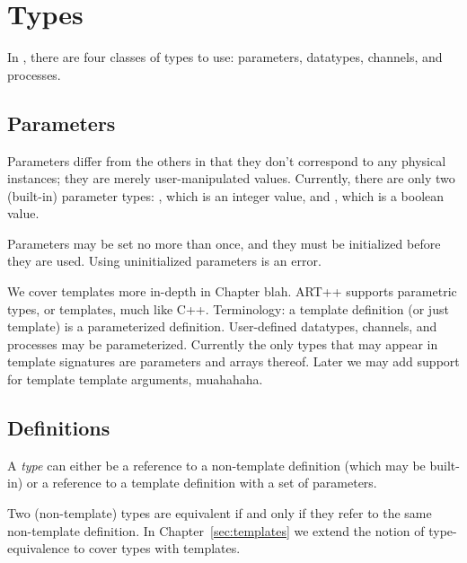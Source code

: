 
\chapter{Types}
\label{sec:types}

In \artxx, there are four classes of types to use:
parameters, datatypes, channels, and processes.  

\section{Parameters}
\label{sec:parameters}

Parameters differ from the others in that they don't correspond
to any physical instances; they are merely user-manipulated values.  
Currently, there are only two (built-in) parameter types: 
\pint, which is an integer value,
and \pbool, which is a boolean value.  

Parameters may be set no more than once, and they must be 
initialized before they are used.  
Using uninitialized parameters is an error.  


We cover templates more in-depth in Chapter blah.  
ART++ supports parametric types, or templates, much like C++. 
Terminology: a template definition (or just template)
is a parameterized definition.  
User-defined datatypes, channels, and processes may be parameterized.  
Currently the only types that may appear in template signatures
are parameters and arrays thereof.  
Later we may add support for template template arguments, muahahaha.  

\section{Definitions}
\label{sec:types:definition}

A \emph{type} can either be a reference to a non-template definition
(which may be built-in) or a reference to a template definition
with a set of parameters.  

Two (non-template) types are equivalent if and only if 
they refer to the same non-template definition.  
In Chapter~\ref{sec:templates} we extend the notion of type-equivalence
to cover types with templates.  

